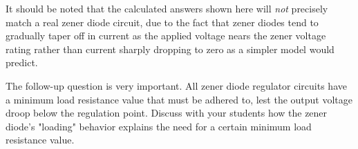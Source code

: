 It should be noted that the calculated answers shown here will {\it not} precisely match a real zener diode circuit, due to the fact that zener diodes tend to gradually taper off in current as the applied voltage nears the zener voltage rating rather than current sharply dropping to zero as a simpler model would predict.

The follow-up question is very important.  All zener diode regulator circuits have a minimum load resistance value that must be adhered to, lest the output voltage droop below the regulation point.  Discuss with your students how the zener diode's "loading" behavior explains the need for a certain minimum load resistance value.




